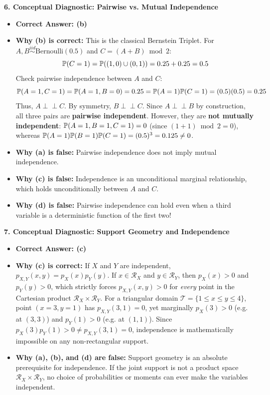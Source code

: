 \textbf{6. Conceptual Diagnostic: Pairwise vs. Mutual Independence}
\begin{itemize}
    \item \textbf{Correct Answer: (b)}
    \item \textbf{Why (b) is correct:} This is the classical Bernstein Triplet. For $A, B \stackrel{iid}{\sim} \text{Bernoulli}(0.5)$ and $C = (A + B) \bmod 2$:
    $$\P(C=1) = \P((1,0) \cup (0,1)) = 0.25 + 0.25 = 0.5$$
    Check pairwise independence between $A$ and $C$:
    $$\P(A=1, C=1) = \P(A=1, B=0) = 0.25 = \P(A=1)\P(C=1) = (0.5)(0.5) = 0.25$$
    Thus, $A \perp\!\!\!\perp C$. By symmetry, $B \perp\!\!\!\perp C$. Since $A \perp\!\!\!\perp B$ by construction, all three pairs are \textbf{pairwise independent}.
    However, they are \textbf{not mutually independent}: $\P(A=1, B=1, C=1) = 0$ (since $(1+1) \bmod 2 = 0$), whereas $\P(A=1)\P(B=1)\P(C=1) = (0.5)^3 = 0.125 \neq 0$.
    \item \textbf{Why (a) is false:} Pairwise independence does not imply mutual independence.
    \item \textbf{Why (c) is false:} Independence is an unconditional marginal relationship, which holds unconditionally between $A$ and $C$.
    \item \textbf{Why (d) is false:} Pairwise independence can hold even when a third variable is a deterministic function of the first two!
\end{itemize}

\textbf{7. Conceptual Diagnostic: Support Geometry and Independence}
\begin{itemize}
    \item \textbf{Correct Answer: (c)}
    \item \textbf{Why (c) is correct:} If $X$ and $Y$ are independent, $p_{X,Y}(x, y) = p_X(x) p_Y(y)$. If $x \in \mathcal{R}_X$ and $y \in \mathcal{R}_Y$, then $p_X(x) > 0$ and $p_Y(y) > 0$, which strictly forces $p_{X,Y}(x, y) > 0$ for \emph{every} point in the Cartesian product $\mathcal{R}_X \times \mathcal{R}_Y$. 
    For a triangular domain $\mathcal{T} = \{1 \le x \le y \le 4\}$, point $(x=3, y=1)$ has $p_{X,Y}(3, 1) = 0$, yet marginally $p_X(3) > 0$ (e.g. at $(3,3)$) and $p_Y(1) > 0$ (e.g. at $(1,1)$). Since $p_X(3)p_Y(1) > 0 \neq p_{X,Y}(3, 1) = 0$, independence is mathematically impossible on any non-rectangular support.
    \item \textbf{Why (a), (b), and (d) are false:} Support geometry is an absolute prerequisite for independence. If the joint support is not a product space $\mathcal{R}_X \times \mathcal{R}_Y$, no choice of probabilities or moments can ever make the variables independent.
\end{itemize}

